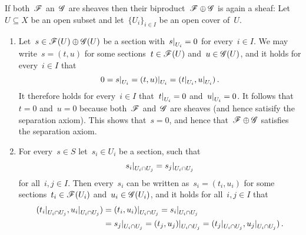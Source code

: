 \begin{example}
\begin{enumerate}
\begin{description}[font=\bfseries]
          If both~$\mathscr{F}$ an~$\mathscr{G}$ are sheaves then their biproduct~$\mathscr{F} \oplus \mathscr{G}$ is again a sheaf:
          Let~$U \subseteq X$ be an open subset and let~$\{ U_i \}_{i \in I}$ be an open cover of~$U$.
          \begin{enumerate}[label=(S\arabic*)]
            \item
              Let~$s \in \mathscr{F}(U) \oplus \mathscr{G}(U)$ be a section with~$\restrict{s}{U_i} = 0$ for every~$i \in I$.
              We may write~$s = (t,u)$ for some sections~$t \in \mathscr{F}(U)$ and~$u \in \mathscr{G}(U)$, and it holds for every~$i \in I$ that
              \[
                  0
                = \restrict{s}{U_i}
                = \restrict{(t,u)}{U_i}
                = ( \restrict{t}{U_i}, \restrict{u}{U_i} ) \,.
              \]
              It therefore holds for every~$i \in I$ that~$\restrict{t}{U_i} = 0$ and~$\restrict{u}{U_i} = 0$.
              It follows that~$t = 0$ and~$u = 0$ because both~$\mathscr{F}$ and~$\mathscr{G}$ are sheaves (and hence satisify the separation axiom).
              This shows that~$s = 0$, and hence that~$\mathscr{F} \oplus \mathscr{G}$ satisfies the separation axiom.
            \item
              For every~$s \in S$ let~$s_i \in U_i$ be a section, such that
              \[
                  \restrict{s_i}{U_i \cap U_j}
                = \restrict{s_j}{U_i \cap U_j}
              \]
              for all~$i,j \in I$.
              Then every~$s_i$ can be written as~$s_i = (t_i, u_i)$ for some sections~$t_i \in \mathscr{F}(U_i)$ and~$u_i \in \mathscr{G}(U_i)$, and it holds for all~$i, j \in I$ that
              \begin{align*}
                    (\restrict{t_i}{U_i \cap U_j}, \restrict{u_i}{U_i \cap U_j})
                &=  \restrict{(t_i, u_i)}{U_i \cap U_j}
                 =  \restrict{s_i}{U_i \cap U_j}  \\
                &=  \restrict{s_j}{U_i \cap U_j}
                 =  \restrict{(t_j, u_j)}{U_i \cap U_j}
                 =  (\restrict{t_j}{U_i \cap U_j}, \restrict{u_j}{U_i \cap U_j}) \,.
              \end{align*}

\end{enumerate}
\end{description}
\end{enumerate}
\end{example}

